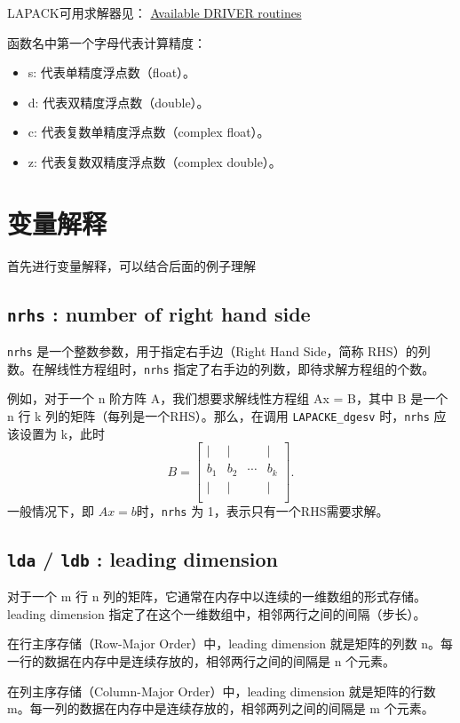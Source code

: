 \documentclass[a4paper,7pt,onecolumn,oneside]{article}
\begin{document}
LAPACK可用求解器见：
\href{http://sites.science.oregonstate.edu/~landaur/nacphy/lapack/simple.html}{Available DRIVER routines}

函数名中第一个字母代表计算精度：
\begin{itemize}
\item
  s: 代表单精度浮点数（float）。
\item
  d: 代表双精度浮点数（double）。
\item
  c: 代表复数单精度浮点数（complex float）。
\item
  z: 代表复数双精度浮点数（complex double）。
\end{itemize}

\section{变量解释}
\label{sec:variable}
首先进行变量解释，可以结合后面的例子理解
\subsection{\texttt{nrhs}  :  number of right hand side}
\label{sec:nrhs}
\texttt{nrhs} 是一个整数参数，用于指定右手边（Right Hand Side，简称 RHS）的列数。在解线性方程组时，\texttt{nrhs} 指定了右手边的列数，即待求解方程组的个数。

例如，对于一个 n 阶方阵 A，我们想要求解线性方程组 Ax = B，其中 B 是一个 n 行 k 列的矩阵（每列是一个RHS）。那么，在调用 \texttt{LAPACKE\_dgesv} 时，\texttt{nrhs} 应该设置为 k，此时
\[
  B =
  \begin{bmatrix}
    \vert & \vert &  & \vert \\
    b_1 & b_2 & \cdots & b_k \\
    \vert & \vert &  & \vert \\
  \end{bmatrix}.
\]
一般情况下，即 $Ax = b$时，\texttt{nrhs} 为 1，表示只有一个RHS需要求解。
\subsection{\texttt{lda} / \texttt{ldb}  :  leading dimension}
\label{sec:lda}
对于一个 m 行 n 列的矩阵，它通常在内存中以连续的一维数组的形式存储。leading dimension 指定了在这个一维数组中，相邻两行之间的间隔（步长）。

在行主序存储（Row-Major Order）中，leading dimension 就是矩阵的列数 n。每一行的数据在内存中是连续存放的，相邻两行之间的间隔是 n 个元素。

在列主序存储（Column-Major Order）中，leading dimension 就是矩阵的行数 m。每一列的数据在内存中是连续存放的，相邻两列之间的间隔是 m 个元素。
\end{document}
